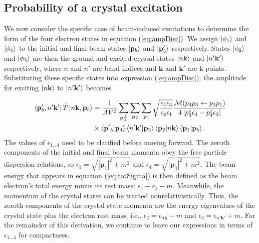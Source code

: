 \documentclass{article}
\begin{document}
\subsection{Probability of a crystal excitation} 
\label{sec:crystal}

We now consider the specific case of beam-induced excitations to determine the
form of the four electron states in equation (\ref{eq:ampDisc}).  We assign
$\ket{\phi_1}$ and $\ket{\phi_4}$ to the initial and final beam states
$\ket{\mathbf{p}_b}$ and $\ket{\mathbf{p}_b'}$ respectively.  States $\ket{\phi_2}$ and
$\ket{\phi_3}$ are then the ground and excited crystal states
$\ket{n\mathbf{k}}$ and $\ket{n'\mathbf{k'}}$ respectively, where $n$ and $n'$
are band indices and $\mathbf{k}$ and $\mathbf{k'}$ are k-points.
Substituting these specific states into expression (\ref{eq:ampDisc}), the
amplitude for exciting $\ket{n\mathbf{k}}$ to $\ket{n'\mathbf{k'}}$ becomes

\begin{equation} 
  \label{eq:ampCrystal} 
  \begin{aligned}
    \bra{\mathbf{p}_b', n'\mathbf{k'}} \hat{T} \ket{n\mathbf{k},\mathbf{p}_b}
    &=
    \frac{1}{AV^2}
    \sum_{\mathbf{p}_3^\perp} \sum_{\mathbf{p}_2} \sum_{\mathbf{p}_1}
    \sqrt{\frac{\epsilon_4\epsilon_3}{\epsilon_2\epsilon_1}}
    \frac{\mathcal{M}(p_4p_3\leftarrow p_2p_1)}
    {4\left|p_3^z\epsilon_4 - p_4^z\epsilon_3\right|}
    \\&\times
    \bra{\mathbf{p'}_b}\ket{\mathbf{p}_4}
    \bra{n'\mathbf{k'}}\ket{\mathbf{p}_3}
    \bra{\mathbf{p}_2}\ket{n\mathbf{k}}
    \bra{\mathbf{p}_1}\ket{\mathbf{p}_b}.
  \end{aligned}
\end{equation}
%
The values of $\epsilon_{1\dots4}$ need to be clarified before moving forward.
The zeroth components of the initial and final beam momenta obey the free
particle dispersion relations, so 
$\epsilon_1 = \sqrt{|\mathbf{p}_1|^2 + m^2}$
and
$\epsilon_4 = \sqrt{|\mathbf{p}_4|^2 + m^2}$.
The beam energy that appears in equation (\ref{eq:totSigma}) is then
defined as the beam electron's total energy minus its rest mass:
$\epsilon_b\equiv\epsilon_1 - m$.
Meanwhile, the momentum of the crystal states can be treated
nonrelativistically.
Thus, the zeroth components of the crystal state momenta
are the energy eigenvalues of the crystal state plus the electron rest mass,
i.e.,
$\epsilon_2=\epsilon_{n\mathbf{k}} + m$
and
$\epsilon_3=\epsilon_{n'\mathbf{k'}} + m$.
For the remainder of this derivation, we continue to leave our expressions
in terms of $\epsilon_{1\dots4}$ for compactness.
\end{document}
